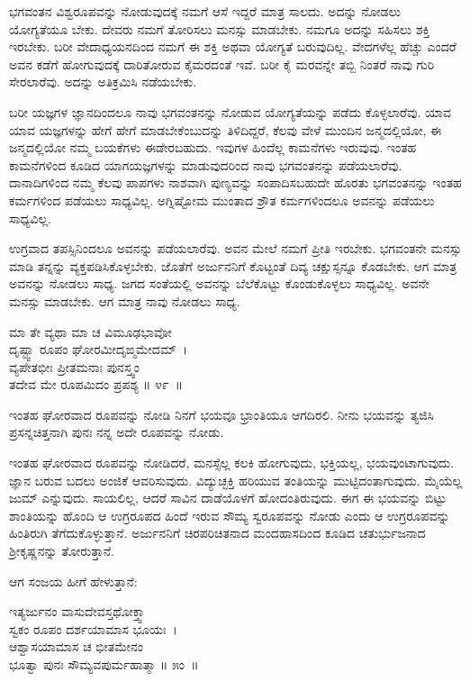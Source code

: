 ಭಗವಂತನ ವಿಶ್ವರೂಪವನ್ನು ನೋಡುವುದಕ್ಕೆ ನಮಗೆ ಆಸೆ ಇದ್ದರೆ ಮಾತ್ರ ಸಾಲದು. ಅದನ್ನು ನೋಡಲು ಯೋಗ್ಯತೆಯೂ ಬೇಕು. ದೇವರು ನಮಗೆ ತೋರಿಸಲು ಮನಸ್ಸು ಮಾಡಬೇಕು. ನಮಗೂ ಅದನ್ನು ಸಹಿಸಲು ಶಕ್ತಿ ಇರಬೇಕು. ಬರೀ ವೇದಾಧ್ಯಯನದಿಂದ ನಮಗೆ ಈ ಶಕ್ತಿ ಅಥವಾ ಯೋಗ್ಯತೆ ಬರುವುದಿಲ್ಲ. ವೇದಗಳೆಲ್ಲ ಹೆಚ್ಚು ಎಂದರೆ ಅವನ ಕಡೆಗೆ ಹೋಗುವುದಕ್ಕೆ ದಾರಿತೋರುವ ಕೈಮರದಂತೆ ಇವೆ. ಬರೀ ಕೈ ಮರವನ್ನೇ ತಬ್ಬಿ ನಿಂತರೆ ನಾವು ಗುರಿ ಸೇರಲಾರೆವು. ಅದನ್ನು ಅತಿಕ್ರಮಿಸಿ ನಡೆಯಬೇಕು.

ಬರೀ ಯಜ್ಞಗಳ ಜ್ಞಾನದಿಂದಲೂ ನಾವು ಭಗವಂತನನ್ನು ನೋಡುವ ಯೋಗ್ಯತೆಯನ್ನು ಪಡೆದು ಕೊಳ್ಳಲಾರೆವು. ಯಾವ ಯಾವ ಯಜ್ಞಗಳನ್ನು ಹೇಗೆ ಹೇಗೆ ಮಾಡಬೇಕೆಂಬುದನ್ನು ತಿಳಿದಿದ್ದರೆ, ಕೆಲವು ವೇಳೆ ಮುಂದಿನ ಜನ್ಮದಲ್ಲಿಯೋ, ಈ ಜನ್ಮದಲ್ಲಿಯೋ ನಮ್ಮ ಬಯಕೆಗಳು ಈಡೇರಬಹುದು. ಇವುಗಳ ಹಿಂದೆಲ್ಲ ಕಾಮನೆಗಳು ಇರುವುವು. ಇಂತಹ ಕಾಮನೆಗಳಿಂದ ಕೂಡಿದ ಯಾಗಯಜ್ಞಗಳನ್ನು ಮಾಡುವುದರಿಂದ ನಾವು ಭಗವಂತನನ್ನು ಪಡೆಯಲಾರೆವು. ದಾನಾದಿಗಳಿಂದ ನಮ್ಮ ಕೆಲವು ಪಾಪಗಳು ನಾಶವಾಗಿ ಪುಣ್ಯವನ್ನು ಸಂಪಾದಿಸಬಹುದೇ ಹೊರತು ಭಗವಂತನನ್ನು ಇಂತಹ ಕರ್ಮಗಳಿಂದ ಪಡೆಯಲು ಸಾಧ್ಯವಿಲ್ಲ. ಅಗ್ನಿಷ್ಟೋಮ ಮುಂತಾದ ಶ್ರೌತ ಕರ್ಮಗಳಿಂದಲೂ ಅವನನ್ನು ಪಡೆಯಲು ಸಾಧ್ಯವಿಲ್ಲ.

ಉಗ್ರವಾದ ತಪಸ್ಸಿನಿಂದಲೂ ಅವನನ್ನು ಪಡೆಯಲಾರೆವು. ಅವನ ಮೇಲೆ ನಮಗೆ ಪ್ರೀತಿ ಇರಬೇಕು. ಭಗವಂತನೇ ಮನಸ್ಸು ಮಾಡಿ ತನ್ನನ್ನು ವ್ಯಕ್ತಪಡಿಸಿಕೊಳ್ಳಬೇಕು. ಜೊತೆಗೆ ಅರ್ಜುನನಿಗೆ ಕೊಟ್ಟಂತೆ ದಿವ್ಯ ಚಕ್ಷುಸ್ಸನ್ನೂ ಕೊಡಬೇಕು. ಆಗ ಮಾತ್ರ ಅವನನ್ನು ನೋಡಲು ಸಾಧ್ಯ. ಜಗದ ಸಂತೆಯಲ್ಲಿ ಅವನನ್ನು ಬೆಲೆಕೊಟ್ಟು ಕೊಂಡುಕೊಳ್ಳಲು ಸಾಧ್ಯವಿಲ್ಲ. ಅವನೇ ಮನಸ್ಸು ಮಾಡಬೇಕು. ಆಗ ಮಾತ್ರ ನಾವು ನೋಡಲು ಸಾಧ್ಯ.

\begin{shloka}
ಮಾ ತೇ ವ್ಯಥಾ ಮಾ ಚ ವಿಮೂಢಭಾವೋ \\ ದೃಷ್ಟ್ವಾ ರೂಪಂ ಘೋರಮೀದೃಙ್ಮಮೇದಮ್~।\\ವ್ಯಪೇತಭೀಃ ಪ್ರೀತಮನಾಃ ಪುನಸ್ತ್ವಂ \\ ತದೇವ ಮೇ ರೂಪಮಿದಂ ಪ್ರಪಶ್ಯ \hfill॥ ೪೯~॥
\end{shloka}

\begin{artha}
ಇಂತಹ ಘೋರವಾದ ರೂಪವನ್ನು ನೋಡಿ ನಿನಗೆ ಭಯವೂ ಭ್ರಾಂತಿಯೂ ಆಗದಿರಲಿ. ನೀನು ಭಯವನ್ನು ತ್ಯಜಿಸಿ ಪ್ರಸನ್ನಚಿತ್ತನಾಗಿ ಪುನಃ ನನ್ನ ಅದೇ ರೂಪವನ್ನು ನೋಡು.
\end{artha}

ಇಂತಹ ಘೋರವಾದ ರೂಪವನ್ನು ನೋಡಿದರೆ, ಮನಸ್ಸೆಲ್ಲ ಕಲಕಿ ಹೋಗುವುದು, ಭಕ್ತಿಯಲ್ಲ, ಭಯವುಂಟಾಗುವುದು. ಜ್ಞಾನ ಬರುವ ಬದಲು ಅಂಜಿಕೆ ಆವರಿಸುವುದು. ವಿದ್ಯುಚ್ಛಕ್ತಿ ಹರಿಯುವ ತಂತಿಯನ್ನು ಮುಟ್ಟಿದಂತಾಗುವುದು. ಮೈಯೆಲ್ಲ ಜುಮ್ ಎನ್ನುವುದು. ಸಾಯಲಿಲ್ಲ, ಆದರೆ ಸಾವಿನ ದಾಡೆಯೊಳಗೆ ಹೋದಂತಿರುವುದು. ಈಗ ಈ ಭಯವನ್ನು ಬಿಟ್ಟು ಶಾಂತಿಯನ್ನು ಹೊಂದಿ ಆ ಉಗ್ರರೂಪದ ಹಿಂದೆ ಇರುವ ಸೌಮ್ಯ ಸ್ವರೂಪವನ್ನು ನೋಡು ಎಂದು ಆ ಉಗ್ರರೂಪವನ್ನು ಹಿಂತಿರುಗಿ ತೆಗೆದುಕೊಳ್ಳುತ್ತಾನೆ. ಅರ್ಜುನನಿಗೆ ಚಿರಪರಿಚಿತನಾದ ಮಂದಹಾಸದಿಂದ ಕೂಡಿದ ಚತುರ್ಭುಜನಾದ ಶ‍್ರೀಕೃಷ್ಣನನ್ನು ತೋರುತ್ತಾನೆ.

ಆಗ ಸಂಜಯ ಹೀಗೆ ಹೇಳುತ್ತಾನೆ:

\begin{shloka}
ಇತ್ಯರ್ಜುನಂ ವಾಸುದೇವಸ್ತಥೋಕ್ತ್ವಾ \\ ಸ್ವಕಂ ರೂಪಂ ದರ್ಶಯಾಮಾಸ ಭೂಯಃ~।\\ಆಶ್ವಾಸಯಾಮಾಸ ಚ ಭೀತಮೇನಂ \\ ಭೂತ್ವಾ ಪುನಃ ಸೌಮ್ಯವಪುರ್ಮಹಾತ್ಮಾ \hfill॥ ೫ಂ~॥
\end{shloka}

